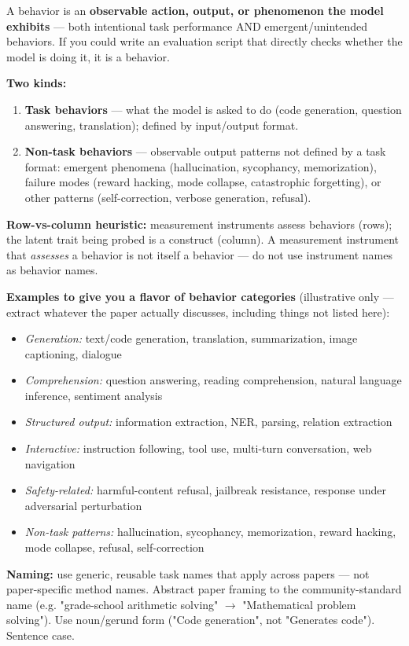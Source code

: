 \begin{tcolorbox}[breakable,enhanced,colback=blue!3,colframe=blue!40!black,title={Prompt},fonttitle=\bfseries,left=8pt,right=8pt,top=6pt,bottom=6pt]
A behavior is an \textbf{observable action, output, or phenomenon the model exhibits} --- both intentional task performance AND emergent/unintended behaviors. If you could write an evaluation script that directly checks whether the model is doing it, it is a behavior.

\textbf{Two kinds:}
\begin{enumerate}
\item \textbf{Task behaviors} --- what the model is asked to do (code generation, question answering, translation); defined by input/output format.
\item \textbf{Non-task behaviors} --- observable output patterns not defined by a task format: emergent phenomena (hallucination, sycophancy, memorization), failure modes (reward hacking, mode collapse, catastrophic forgetting), or other patterns (self-correction, verbose generation, refusal).
\end{enumerate}

\textbf{Row-vs-column heuristic:} measurement instruments assess behaviors (rows); the latent trait being probed is a construct (column). A measurement instrument that \textit{assesses} a behavior is not itself a behavior --- do not use instrument names as behavior names.

\textbf{Examples to give you a flavor of behavior categories} (illustrative only --- extract whatever the paper actually discusses, including things not listed here):
\begin{itemize}
\item \textit{Generation:} text/code generation, translation, summarization, image captioning, dialogue
\item \textit{Comprehension:} question answering, reading comprehension, natural language inference, sentiment analysis
\item \textit{Structured output:} information extraction, NER, parsing, relation extraction
\item \textit{Interactive:} instruction following, tool use, multi-turn conversation, web navigation
\item \textit{Safety-related:} harmful-content refusal, jailbreak resistance, response under adversarial perturbation
\item \textit{Non-task patterns:} hallucination, sycophancy, memorization, reward hacking, mode collapse, refusal, self-correction
\end{itemize}

\textbf{Naming:} use generic, reusable task names that apply across papers --- not paper-specific method names. Abstract paper framing to the community-standard name (e.g. "grade-school arithmetic solving" $\rightarrow$ "Mathematical problem solving"). Use noun/gerund form ("Code generation", not "Generates code"). Sentence case.


\end{tcolorbox}
